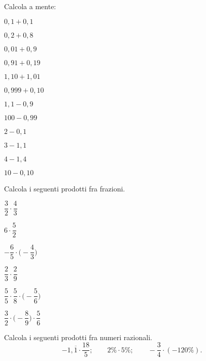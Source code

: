 \begin{esercizio}
 \label{ese:3.47}
Calcola a mente:
\begin{multicols}{4}
\begin{enumeratea}
\item \(0,1+0,1\)
\item \(0,2+0,8\)
\item \(0,01+0,9\)
\item \(0,91+0,19\)
\item \(1,10+1,01\)
\item \(0,999+0,10\)
\item \(1,1-0,9\)
\item \(100-0,99\)
\item \(2-0,1\)
\item \(3-1,1\)
\item \(4-1,4\)
\item \(10-0,10\)
\end{enumeratea}
\end{multicols}
\end{esercizio}


\begin{esercizio}
 \label{ese:3.48}
Calcola i seguenti prodotti fra frazioni.
\begin{multicols}{3}
\begin{enumeratea}
\spazielenx
 \item \(\dfrac{3}{2}\cdot\dfrac{4}{3}\)
 \item \(6\cdot\dfrac{5}{2}\)
 \item \(-\dfrac{6}{5}\cdot\bigg(-\dfrac{4}{3}\bigg)\)
 \item \(\dfrac{2}{3}\cdot\dfrac{2}{9}\)
 \item \(\dfrac{5}{5}\cdot\dfrac{5}{8}\cdot\bigg(-\dfrac{5}{6}\bigg)\)
 \item \(\dfrac{3}{2}\cdot\bigg(-\dfrac{8}{9}\bigg)\cdot\dfrac{5}{6}\)
\end{enumeratea}
\end{multicols}
\end{esercizio}

\begin{esercizio}
 \label{ese:3.49}
Calcola i seguenti prodotti fra numeri razionali.
\[-1,\overline{1}\cdot\frac{18}{5};\qquad2\%\cdot5\%;\qquad-\frac{3}{4}
\cdot(-120\%).\]
\end{esercizio}

